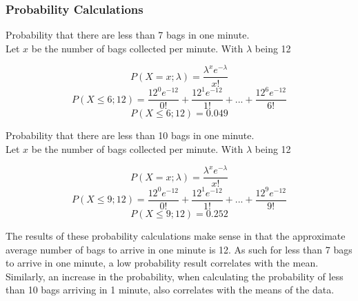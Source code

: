 \documentclass[11pt]{article}
\begin{document}
\subsubsection{Probability Calculations}
 Probability that there are less than 7 bags in one minute.\\
Let $x$ be the number of bags collected per minute. With $\lambda$ being 12
\begin{mdframed}
\begin{center}
\begin{equation}
P(X=x;\lambda)=\frac{\lambda^x e^{-\lambda}}{x!}
\end{equation}
\hspace{1cm}
\begin{equation}
P(X\leq6;12)=\frac{12^0 e^{-12}}{0!}+\frac{12^1 e^{-12}}{1!}+...+\frac{12^6 e^{-12}}{6!}
\end{equation}
\hspace{1cm}
\begin{equation}
P(X\leq6;12)=0.049
\end{equation}
\hspace{1cm}
\end{center}
\end{mdframed}
\newpage
Probability that there are less than 10 bags in one minute.\\
Let $x$ be the number of bags collected per minute. With $\lambda$ being 12
\begin{mdframed}
\begin{center}
\begin{equation}
P(X=x;\lambda)=\frac{\lambda^x e^{-\lambda}}{x!}
\end{equation}
\hspace{1cm}
\begin{equation}
P(X\leq9;12)=\frac{12^0 e^{-12}}{0!}+\frac{12^1 e^{-12}}{1!}+...+\frac{12^9 e^{-12}}{9!}
\end{equation}
\hspace{1cm}
\begin{equation}
P(X\leq9;12)=0.252
\end{equation}
\hspace{1cm}
\end{center}
\end{mdframed}
The results of these probability calculations make sense in that the approximate average number of bags to arrive in one minute is 12. As such for less than 7 bags to arrive in one minute, a low probability result correlates with the mean. Similarly, an increase in the probability, when calculating the probability of less than 10 bags arriving in 1 minute, also correlates with the means of the data.
\end{document}
